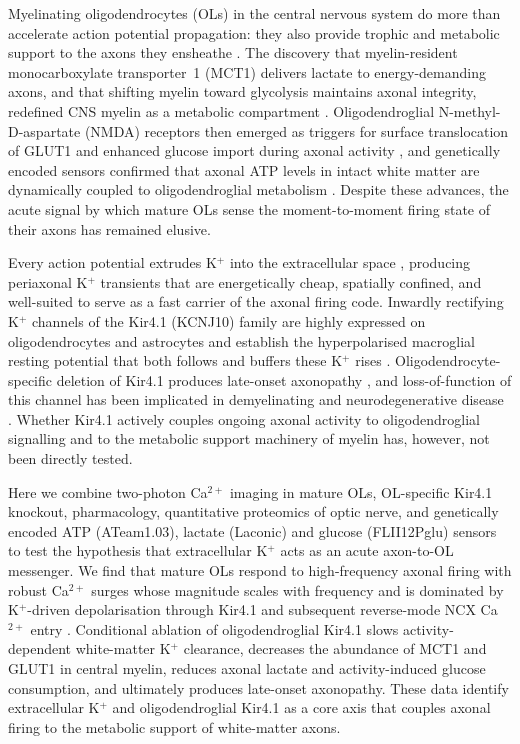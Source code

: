 \documentclass[11pt,a4paper]{article}
\begin{document}
Myelinating oligodendrocytes (OLs) in the central nervous system do more than accelerate action potential propagation: they also provide trophic and metabolic support to the axons they ensheathe \citep{Nave2010,Simons2016,Philips2017}. The discovery that myelin-resident monocarboxylate transporter~1 (MCT1) delivers lactate to energy-demanding axons, and that shifting myelin toward glycolysis maintains axonal integrity, redefined CNS myelin as a metabolic compartment \citep{Funfschilling2012,Lee2012}. Oligodendroglial N-methyl-D-aspartate (NMDA) receptors then emerged as triggers for surface translocation of GLUT1 and enhanced glucose import during axonal activity \citep{Saab2016}, and genetically encoded sensors confirmed that axonal ATP levels in intact white matter are dynamically coupled to oligodendroglial metabolism \citep{Trevisiol2017,Chamberlain2021}. Despite these advances, the acute signal by which mature OLs sense the moment-to-moment firing state of their axons has remained elusive.

Every action potential extrudes K$^+$ into the extracellular space \citep{Kofuji2000,Olsen2015}, producing periaxonal K$^+$ transients that are energetically cheap, spatially confined, and well-suited to serve as a fast carrier of the axonal firing code. Inwardly rectifying K$^+$ channels of the Kir4.1 (KCNJ10) family are highly expressed on oligodendrocytes and astrocytes and establish the hyperpolarised macroglial resting potential that both follows and buffers these K$^+$ rises \citep{Neusch2001,Djukic2007,Larson2018,Hawkins2017}. Oligodendrocyte-specific deletion of Kir4.1 produces late-onset axonopathy \citep{Schirmer2018}, and loss-of-function of this channel has been implicated in demyelinating and neurodegenerative disease \citep{Tong2014,Stumpf2019,Battefeld2019}. Whether Kir4.1 actively couples ongoing axonal activity to oligodendroglial signalling and to the metabolic support machinery of myelin has, however, not been directly tested.

Here we combine two-photon Ca$^{2+}$ imaging in mature OLs, OL-specific Kir4.1 knockout, pharmacology, quantitative proteomics of optic nerve, and genetically encoded ATP (ATeam1.03), lactate (Laconic) and glucose (FLII12Pglu) sensors to test the hypothesis that extracellular K$^+$ acts as an acute axon-to-OL messenger. We find that mature OLs respond to high-frequency axonal firing with robust Ca$^{2+}$ surges whose magnitude scales with frequency and is dominated by K$^+$-driven depolarisation through Kir4.1 and subsequent reverse-mode NCX Ca$^{2+}$ entry \citep{Stys1992,Tekkok2005,Micu2018}. Conditional ablation of oligodendroglial Kir4.1 slows activity-dependent white-matter K$^+$ clearance, decreases the abundance of MCT1 and GLUT1 in central myelin, reduces axonal lactate and activity-induced glucose consumption, and ultimately produces late-onset axonopathy. These data identify extracellular K$^+$ and oligodendroglial Kir4.1 as a core axis that couples axonal firing to the metabolic support of white-matter axons.
\end{document}
